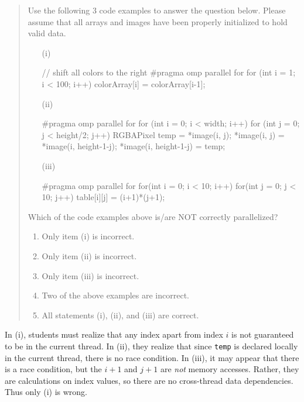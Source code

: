 \documentclass[conference]{./IEEEtran}
\begin{document}
\begin{quote}
Use the following 3 code examples to answer the question below. Please assume
that all arrays and images have been properly initialized to hold valid data.

{\small
\begin{itemize}

\item[(i)]
\begin{cppcode}
// shift all colors to the right
#pragma omp parallel for
for (int i = 1; i < 100; i++)
   colorArray[i] = colorArray[i-1];
\end{cppcode}

\item[(ii)]
\begin{cppcode}
#pragma omp parallel for
for (int i = 0; i < width; i++)
{
   for (int j = 0; j < height/2; j++)
   {
      RGBAPixel temp = *image(i, j);
      *image(i, j)
          = *image(i, height-1-j);
      *image(i, height-1-j) = temp;
   }
}
\end{cppcode}

\item[(iii)]
\begin{cppcode}
#pragma omp parallel for
for(int i = 0; i < 10; i++)
   for(int j = 0; j < 10; j++)
      table[i][j] = (i+1)*(j+1); 
\end{cppcode}

\end{itemize}
}

Which of the code examples above is/are NOT correctly parallelized?
\begin{enumerate}
\item Only item (i) is incorrect.
\item Only item (ii) is incorrect.
\item Only item (iii) is incorrect.
\item Two of the above examples are incorrect.
\item All statements (i), (ii), and (iii) are correct.
\end{enumerate}
\end{quote}

In (i), students must realize that any index apart from index $i$ is not
guaranteed to be in the current thread. In (ii), they realize that since
{\small\verb|temp|} is declared locally in the current thread, there is no race
condition. In (iii), it may appear that there is a race condition, but the $i +
1$ and $j + 1$ are \emph{not} memory accesses. Rather, they are calculations on
index values, so there are no cross-thread data dependencies. Thus only (i) is
wrong.
\end{document}
